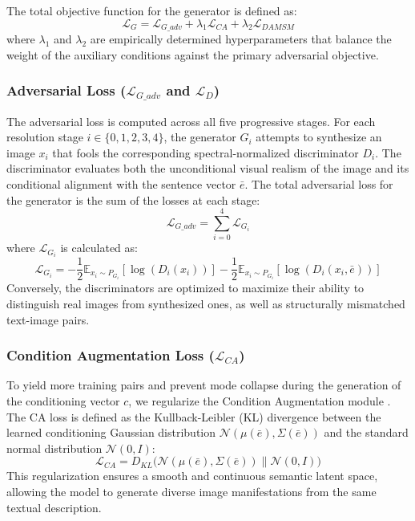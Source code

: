 \documentclass[conference]{IEEEtran}
\begin{document}
The total objective function for the generator is defined as:
\begin{equation}
    \mathcal{L}_{G} = \mathcal{L}_{G\_adv} + \lambda_1 \mathcal{L}_{CA} + \lambda_2 \mathcal{L}_{DAMSM}
\end{equation}
where $\lambda_1$ and $\lambda_2$ are empirically determined hyperparameters that balance the weight of the auxiliary conditions against the primary adversarial objective.

\subsubsection{Adversarial Loss ($\mathcal{L}_{G\_adv}$ and $\mathcal{L}_{D}$)}
The adversarial loss is computed across all five progressive stages. For each resolution stage $i \in \{0, 1, 2, 3, 4\}$, the generator $G_i$ attempts to synthesize an image $x_i$ that fools the corresponding spectral-normalized discriminator $D_i$. The discriminator evaluates both the unconditional visual realism of the image and its conditional alignment with the sentence vector $\bar{e}$. The total adversarial loss for the generator is the sum of the losses at each stage:
\begin{equation}
    \mathcal{L}_{G\_adv} = \sum_{i=0}^{4} \mathcal{L}_{G_i}
\end{equation}
where $\mathcal{L}_{G_i}$ is calculated as:
\begin{equation}
    \mathcal{L}_{G_i} = -\frac{1}{2} \mathbb{E}_{x_i \sim P_{G_i}} [\log(D_i(x_i))] - \frac{1}{2} \mathbb{E}_{x_i \sim P_{G_i}} [\log(D_i(x_i, \bar{e}))]
\end{equation}
Conversely, the discriminators are optimized to maximize their ability to distinguish real images from synthesized ones, as well as structurally mismatched text-image pairs.

\subsubsection{Condition Augmentation Loss ($\mathcal{L}_{CA}$)}
To yield more training pairs and prevent mode collapse during the generation of the conditioning vector $c$, we regularize the Condition Augmentation module \cite{zhang2018stackgan}. The CA loss is defined as the Kullback-Leibler (KL) divergence between the learned conditioning Gaussian distribution $\mathcal{N}(\mu(\bar{e}), \Sigma(\bar{e}))$ and the standard normal distribution $\mathcal{N}(0, I)$:
\begin{equation}
    \mathcal{L}_{CA} = D_{KL} \big( \mathcal{N}(\mu(\bar{e}), \Sigma(\bar{e})) \parallel \mathcal{N}(0, I) \big)
\end{equation}
This regularization ensures a smooth and continuous semantic latent space, allowing the model to generate diverse image manifestations from the same textual description.
\end{document}

